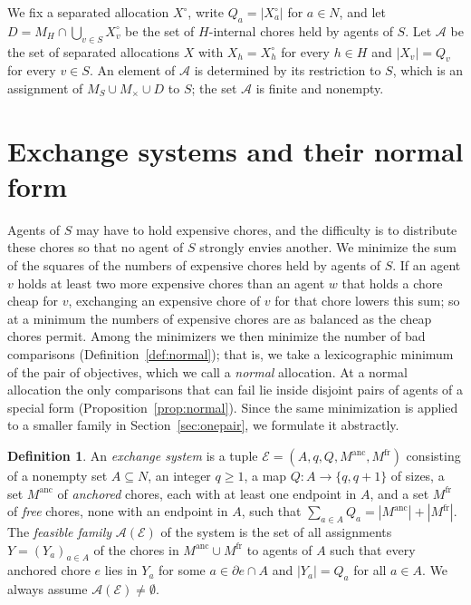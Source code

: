 \documentclass{amsart}
\numberwithin{equation}{section}
\theoremstyle{definition}
\newtheorem{definition}[theorem]{Definition}
\theoremstyle{remark}
\newcommand{\cA}{\mathcal{A}}
\newcommand{\cE}{\mathcal{E}}
\newcommand{\anc}{\mathrm{anc}}
\newcommand{\fr}{\mathrm{fr}}
\newcommand{\bd}{\partial}
\begin{document}
We fix a separated allocation $X^\circ$, write $Q_a=|X^\circ_a|$ for $a\in N$, and let $D=M_H\cap\bigcup_{v\in S}X^\circ_v$ be the set of $H$-internal chores held by agents of $S$. Let $\cA$ be the set of separated allocations $X$ with $X_h=X^\circ_h$ for every $h\in H$ and $|X_v|=Q_v$ for every $v\in S$. An element of $\cA$ is determined by its restriction to $S$, which is an assignment of $M_S\cup M_\times\cup D$ to $S$; the set $\cA$ is finite and nonempty.

\section{Exchange systems and their normal form}\label{sec:exchange}

Agents of $S$ may have to hold expensive chores, and the difficulty is to distribute these chores so that no agent of $S$ strongly envies another. We minimize the sum of the squares of the numbers of expensive chores held by agents of $S$. If an agent $v$ holds at least two more expensive chores than an agent $w$ that holds a chore cheap for $v$, exchanging an expensive chore of $v$ for that chore lowers this sum; so at a minimum the numbers of expensive chores are as balanced as the cheap chores permit. Among the minimizers we then minimize the number of bad comparisons (Definition~\ref{def:normal}); that is, we take a lexicographic minimum of the pair of objectives, which we call a \emph{normal} allocation. At a normal allocation the only comparisons that can fail lie inside disjoint pairs of agents of a special form (Proposition~\ref{prop:normal}). Since the same minimization is applied to a smaller family in Section~\ref{sec:onepair}, we formulate it abstractly.

\begin{definition}\label{def:system}
An \emph{exchange system} is a tuple $\cE=(A,q,Q,M^\anc,M^\fr)$ consisting of a nonempty set $A\subseteq N$, an integer $q\ge1$, a map $Q\colon A\to\{q,q+1\}$ of sizes, a set $M^\anc$ of \emph{anchored} chores, each with at least one endpoint in $A$, and a set $M^\fr$ of \emph{free} chores, none with an endpoint in $A$, such that $\sum_{a\in A}Q_a=|M^\anc|+|M^\fr|$. The \emph{feasible family} $\cA(\cE)$ of the system is the set of all assignments $Y=(Y_a)_{a\in A}$ of the chores in $M^\anc\cup M^\fr$ to agents of $A$ such that every anchored chore $e$ lies in $Y_a$ for some $a\in\bd e\cap A$ and $|Y_a|=Q_a$ for all $a\in A$. We always assume $\cA(\cE)\ne\emptyset$.
\end{definition}
\end{document}
